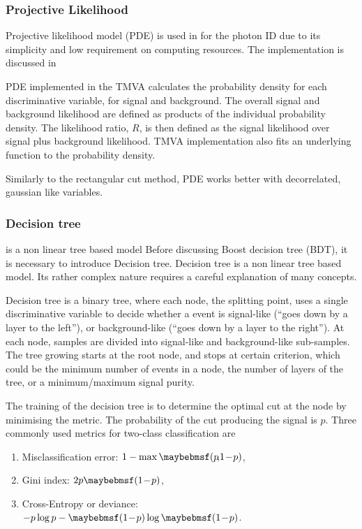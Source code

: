 \subsubsection{Projective Likelihood}

Projective likelihood model (PDE) is used in \pandora for the photon ID  due to its simplicity and low requirement on computing resources. The \pandora implementation is discussed  in 

PDE implemented in the TMVA calculates the probability density for each discriminative variable, for signal and background. The overall signal and background likelihood are defined as products of the individual probability density. The likelihood ratio, $R$, is then defined as the signal likelihood over signal plus background likelihood. TMVA implementation also fits an underlying function to the probability density.


Similarly to the rectangular cut method, PDE works better with decorrelated, gaussian like variables.



\subsubsection{Decision tree}
 is a non linear tree based model
Before discussing Boost decision tree (BDT), it is necessary to introduce Decision tree. Decision tree is a non linear tree based model. Its rather complex nature requires a careful explanation of many concepts.

Decision tree is a binary tree, where each node, the splitting point, uses a single discriminative variable to decide whether a event is signal-like (``goes down by a layer to the left''), or background-like (``goes down by a layer to the right''). At each node, samples are divided into signal-like and background-like sub-samples. The tree growing starts at the root node, and stops at certain criterion, which could be the minimum number of events in a node, the number of layers of the tree, or a minimum/maximum signal purity.

The training of the decision tree is to determine the optimal cut at the node by minimising the metric. The probability of the cut producing the signal is $p$. Three commonly used metrics for two-class classification are
\begin{enumerate}
\item Misclassification error:  $1 - \max\parenths{p\!,\!1\!-\!p}$,
\item Gini index: $2p\parenths{1\!-\!p}$,
\item Cross-Entropy or deviance: $-p\log{p}-\parenths{1\!-\!p}\log\parenths{1\!-\!p}$.
\end{enumerate}

